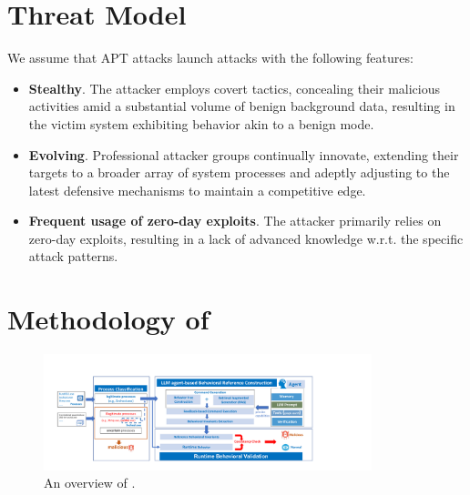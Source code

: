 \section{Threat Model}\label{sec:threatModel}
We assume that APT attacks launch attacks with the following features:

\begin{itemize}[leftmargin=*]
    \item \textbf{Stealthy}. The attacker employs covert tactics, concealing their malicious activities amid a substantial volume of benign background data, resulting in the victim system exhibiting behavior akin to a benign mode.
    \item \textbf{Evolving}. Professional attacker groups continually innovate, extending their targets to a broader array of system processes and adeptly adjusting to the latest defensive mechanisms to maintain a competitive edge.
    \item \textbf{Frequent usage of zero-day exploits}. The attacker primarily relies on zero-day exploits, resulting in a lack of advanced knowledge w.r.t. the specific attack patterns.
\end{itemize}

\section{Methodology of \tool}

\begin{figure}[ht]
    \centering
      \includegraphics[width=0.85\textwidth]{figs/framework_new2.pdf}
    \caption{An overview of \tool. }
    \label{fig-framework}
\end{figure}


